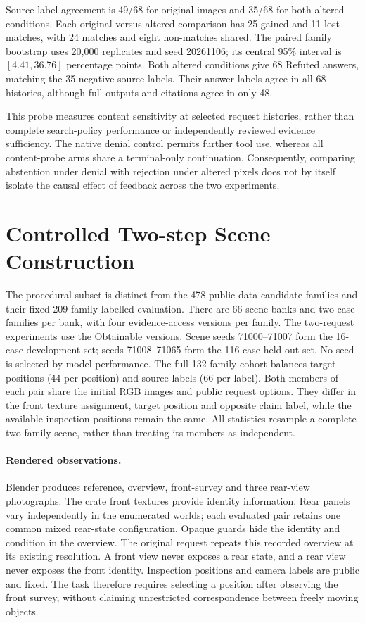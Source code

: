 Source-label agreement is 49/68 for original images and 35/68 for both altered conditions.
Each original-versus-altered comparison has 25 gained and 11 lost matches, with 24 matches and eight non-matches shared.
The paired family bootstrap uses 20,000 replicates and seed 20261106; its central 95\% interval is $[4.41,36.76]$ percentage points.
Both altered conditions give 68 Refuted answers, matching the 35 negative source labels.
Their answer labels agree in all 68 histories, although full outputs and citations agree in only 48.

This probe measures content sensitivity at selected request histories, rather than complete search-policy performance or independently reviewed evidence sufficiency.
The native denial control permits further tool use, whereas all content-probe arms share a terminal-only continuation.
Consequently, comparing abstention under denial with rejection under altered pixels does not by itself isolate the causal effect of feedback across the two experiments.


\section{Controlled Two-step Scene Construction}
The procedural subset is distinct from the 478 public-data candidate families and their fixed 209-family labelled evaluation.
There are 66 scene banks and two case families per bank, with four evidence-access versions per family.
The two-request experiments use the Obtainable versions.
Scene seeds 71000--71007 form the 16-case development set; seeds 71008--71065 form the 116-case held-out set.
No seed is selected by model performance.
The full 132-family cohort balances target positions (44 per position) and source labels (66 per label).
Both members of each pair share the initial RGB images and public request options.
They differ in the front texture assignment, target position and opposite claim label, while the available inspection positions remain the same.
All statistics resample a complete two-family scene, rather than treating its members as independent.

\paragraph{Rendered observations.}
Blender produces reference, overview, front-survey and three rear-view photographs.
The crate front textures provide identity information. Rear panels vary independently in the enumerated worlds; each evaluated pair retains one common mixed rear-state configuration.
Opaque guards hide the identity and condition in the overview.
The original request repeats this recorded overview at its existing resolution.
A front view never exposes a rear state, and a rear view never exposes the front identity.
Inspection positions and camera labels are public and fixed.
The task therefore requires selecting a position after observing the front survey, without claiming unrestricted correspondence between freely moving objects.

